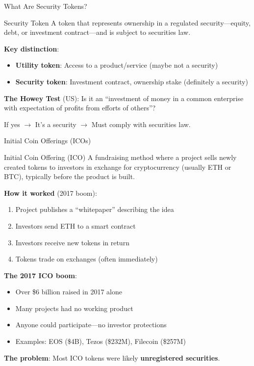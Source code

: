 \documentclass[10pt]{beamer}
\newcommand{\highlight}[1]{\textcolor{AccentOrange}{\textbf{#1}}}
\begin{document}
\begin{frame}{What Are Security Tokens?}
  \begin{block}{Security Token}
    A token that represents ownership in a regulated security---equity, debt, or investment contract---and is subject to securities law.
  \end{block}
  
  \vspace{1em}
  \textbf{Key distinction}:
  \begin{itemize}
    \item \textbf{Utility token}: Access to a product/service (maybe not a security)
    \item \textbf{Security token}: Investment contract, ownership stake (definitely a security)
  \end{itemize}
  
  \vspace{1em}
  \textbf{The Howey Test} (US): Is it an ``investment of money in a common enterprise with expectation of profits from efforts of others''?
  
  \vspace{0.5em}
  If yes $\rightarrow$ It's a security $\rightarrow$ Must comply with securities law.
\end{frame}

\begin{frame}{Initial Coin Offerings (ICOs)}
  \begin{block}{Initial Coin Offering (ICO)}
    A fundraising method where a project sells newly created tokens to investors in exchange for cryptocurrency (usually ETH or BTC), typically before the product is built.
  \end{block}
  
  \vspace{0.5em}
  \textbf{How it worked} (2017 boom):
  \begin{enumerate}
    \item Project publishes a ``whitepaper'' describing the idea
    \item Investors send ETH to a smart contract
    \item Investors receive new tokens in return
    \item Tokens trade on exchanges (often immediately)
  \end{enumerate}

  \vspace{0.5em}
  \textbf{The 2017 ICO boom}:
  \begin{itemize}
    \item Over \$6 billion raised in 2017 alone
    \item Many projects had no working product
    \item Anyone could participate---no investor protections
    \item Examples: EOS (\$4B), Tezos (\$232M), Filecoin (\$257M)
  \end{itemize}
  
  \vspace{0.5em}
  \textbf{The problem}: Most ICO tokens were likely \highlight{unregistered securities}.
\end{frame}
\end{document}
